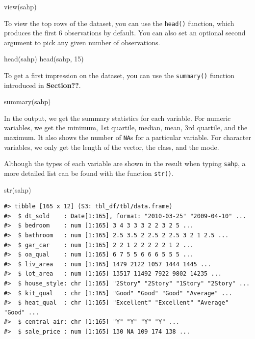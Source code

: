 \documentclass[
]{book}
\newenvironment{Shaded}{\begin{snugshade}}{\end{snugshade}}
\newcommand{\DecValTok}[1]{\textcolor[rgb]{0.00,0.00,0.81}{#1}}
\newcommand{\FunctionTok}[1]{\textcolor[rgb]{0.00,0.00,0.00}{#1}}
\newcommand{\NormalTok}[1]{#1}
\begin{document}
\begin{Shaded}
\begin{Highlighting}[]
\FunctionTok{view}\NormalTok{(sahp)}
\end{Highlighting}
\end{Shaded}

To view the top rows of the dataset, you can
use the \texttt{head()} function, which produces the first 6 observations by default. You can also set an optional second argument to pick any given number of observations.

\begin{Shaded}
\begin{Highlighting}[]
\FunctionTok{head}\NormalTok{(sahp)}
\FunctionTok{head}\NormalTok{(sahp, }\DecValTok{15}\NormalTok{)}
\end{Highlighting}
\end{Shaded}

To get a first impression on the dataset, you can use the \texttt{summary()} function introduced in \textbf{Section??}.

\begin{Shaded}
\begin{Highlighting}[]
\FunctionTok{summary}\NormalTok{(sahp)}
\end{Highlighting}
\end{Shaded}

In the output, we get the summary statistics for each variable. For numeric variables, we get the minimum, 1st quartile, median, mean, 3rd quartile, and the maximum. It also shows the number of \texttt{NA}s for a particular variable. For character variables, we only get the length of the vector, the class, and the mode.

Although the types of each variable are shown in the result when typing \texttt{sahp}, a more detailed list can be found with the function \texttt{str()}.

\begin{Shaded}
\begin{Highlighting}[]
\FunctionTok{str}\NormalTok{(sahp)}
\end{Highlighting}
\end{Shaded}

\begin{verbatim}
#> tibble [165 x 12] (S3: tbl_df/tbl/data.frame)
#>  $ dt_sold    : Date[1:165], format: "2010-03-25" "2009-04-10" ...
#>  $ bedroom    : num [1:165] 3 4 3 3 3 2 2 3 2 5 ...
#>  $ bathroom   : num [1:165] 2.5 3.5 2 2.5 2 2.5 3 2 1 2.5 ...
#>  $ gar_car    : num [1:165] 2 2 1 2 2 2 2 2 1 2 ...
#>  $ oa_qual    : num [1:165] 6 7 5 5 6 6 6 5 5 5 ...
#>  $ liv_area   : num [1:165] 1479 2122 1057 1444 1445 ...
#>  $ lot_area   : num [1:165] 13517 11492 7922 9802 14235 ...
#>  $ house_style: chr [1:165] "2Story" "2Story" "1Story" "2Story" ...
#>  $ kit_qual   : chr [1:165] "Good" "Good" "Good" "Average" ...
#>  $ heat_qual  : chr [1:165] "Excellent" "Excellent" "Average" "Good" ...
#>  $ central_air: chr [1:165] "Y" "Y" "Y" "Y" ...
#>  $ sale_price : num [1:165] 130 NA 109 174 138 ...
\end{verbatim}
\end{document}

